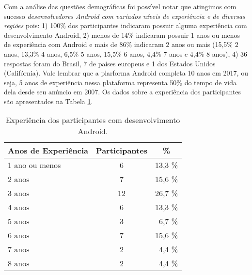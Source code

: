 Com a an\'alise das quest\~oes demogr\'aficas foi poss\'ivel notar que atingimos com sucesso \textit{desenvolvedores Android com variados n\'iveis de experi\^encia e de diversas regi\~oes} pois: 1) 100\% dos participantes indicaram possuir alguma experi\^encia com desenvolvimento Android, 2) menos de 14\% indicaram possuir 1 anos ou menos de experi\^encia com Android e mais de 86\% indicaram 2 anos ou mais (15,5\% 2 anos, 13,3\% 4 anos, 6,5\% 5 anos, 15,5\% 6 anos, 4,4\% 7 anos e 4,4\% 8 anos), 4) 36 respostas foram do Brasil, 7 de pa\'ises europeus e 1 dos Estados Unidos (Calif\'ornia). Vale lembrar que a plarforma Android completa 10 anos em 2017, ou seja, 5 anos de experi\^encia nessa plataforma representa 50\% do tempo de vida dela desde seu an\'uncio em 2007. Os dados sobre a experi\^encia dos participantes s\~ao apresentados na Tabela \ref{tab:DadosDemograficos}.

\begin{table}[h]
\centering
\caption{Experi\^encia dos participantes com desenvolvimento Android.}
\small
\begin{tabular}{@{}l|c|r@{}}
\toprule
\textbf{Anos de Experi\^encia} & \textbf{Participantes} & \multicolumn{1}{c}{\textbf{\%}}  \\
\hline
1 ano ou menos 	&	 6 		& 	13,3 \%	 \\
2 anos 			& 	 7 		& 	15,6 \%	 \\
3 anos 			& 	 12		& 	26,7 \%	 \\
4 anos 			& 	 6 		& 	13,3 \%	 \\
5 anos 			& 	 3 		& 	 6,7 \%	 \\
6 anos 			& 	 7 		& 	15,6 \%	 \\
7 anos 			& 	 2 		& 	 4,4 \%	 \\
8 anos 			& 	 2 		& 	 4,4 \%	 \\
\toprule
\end{tabular}
\label{tab:DadosDemograficos}
\end{table}


